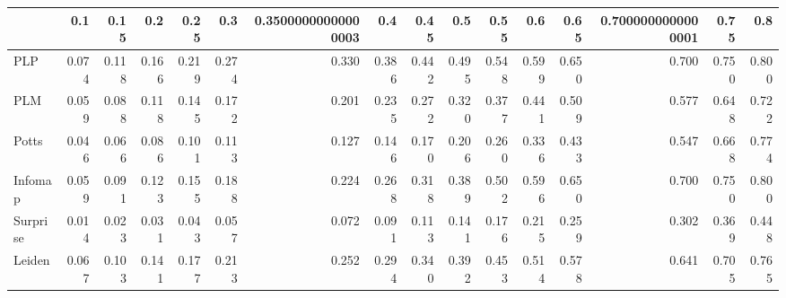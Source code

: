 \begin{tabular}{lrrrrrrrrrrrrrrr}
\toprule
{} &   0.1 &  0.15 &   0.2 &  0.25 &   0.3 & 0.35000000000000003 &   0.4 &  0.45 &   0.5 &  0.55 &   0.6 &  0.65 & 0.7000000000000001 &  0.75 &   0.8 \\
\midrule
PLP      & 0.074 & 0.118 & 0.166 & 0.219 & 0.274 &               0.330 & 0.386 & 0.442 & 0.495 & 0.548 & 0.599 & 0.650 &              0.700 & 0.750 & 0.800 \\
PLM      & 0.059 & 0.088 & 0.118 & 0.145 & 0.172 &               0.201 & 0.235 & 0.272 & 0.320 & 0.377 & 0.441 & 0.509 &              0.577 & 0.648 & 0.722 \\
Potts    & 0.046 & 0.066 & 0.086 & 0.101 & 0.113 &               0.127 & 0.146 & 0.170 & 0.206 & 0.260 & 0.336 & 0.433 &              0.547 & 0.668 & 0.774 \\
Infomap  & 0.059 & 0.091 & 0.123 & 0.155 & 0.188 &               0.224 & 0.268 & 0.318 & 0.389 & 0.502 & 0.596 & 0.650 &              0.700 & 0.750 & 0.800 \\
Surprise & 0.014 & 0.023 & 0.031 & 0.043 & 0.057 &               0.072 & 0.091 & 0.113 & 0.141 & 0.176 & 0.215 & 0.259 &              0.302 & 0.369 & 0.448 \\
Leiden   & 0.067 & 0.103 & 0.141 & 0.177 & 0.213 &               0.252 & 0.294 & 0.340 & 0.392 & 0.453 & 0.514 & 0.578 &              0.641 & 0.705 & 0.765 \\
\bottomrule
\end{tabular}
